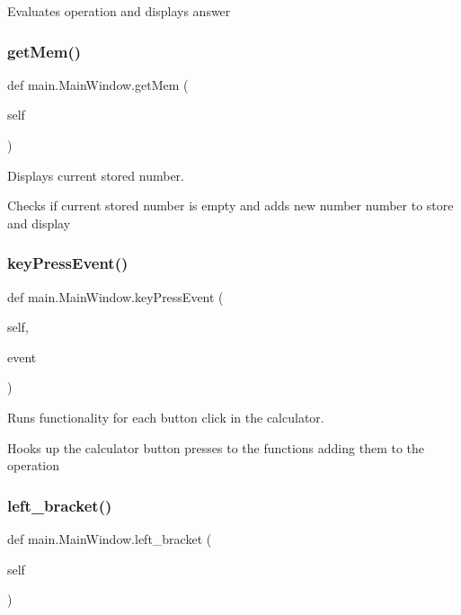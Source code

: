 Evaluates operation and displays answer \mbox{\label{classmain_1_1_main_window_a77d526c3d373219cdd6d6d0437ac3660}} 
\subsubsection{\texorpdfstring{get\+Mem()}{getMem()}}
{\footnotesize\ttfamily def main.\+Main\+Window.\+get\+Mem (\begin{DoxyParamCaption}\item[{}]{self }\end{DoxyParamCaption})}



Displays current stored number. 

Checks if current stored number is empty and adds new number number to store and display \mbox{\label{classmain_1_1_main_window_a298fe7db20162628212e8f665dc098f5}} 
\subsubsection{\texorpdfstring{key\+Press\+Event()}{keyPressEvent()}}
{\footnotesize\ttfamily def main.\+Main\+Window.\+key\+Press\+Event (\begin{DoxyParamCaption}\item[{}]{self,  }\item[{}]{event }\end{DoxyParamCaption})}



Runs functionality for each button click in the calculator. 

Hooks up the calculator button presses to the functions adding them to the operation \mbox{\label{classmain_1_1_main_window_a2e0fc10335f0a466d3681cb2ca47d72c}} 
\subsubsection{\texorpdfstring{left\+\_\+bracket()}{left\_bracket()}}
{\footnotesize\ttfamily def main.\+Main\+Window.\+left\+\_\+bracket (\begin{DoxyParamCaption}\item[{}]{self }\end{DoxyParamCaption})}



